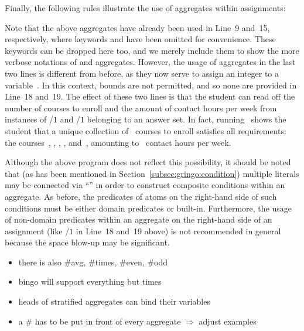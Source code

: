 \begin{example}
Finally, the following rules illustrate the use of aggregates within assignments:
%

%
Note that the above aggregates have already been used in Line~9 and~15, respectively,
where keywords  and  have been omitted for convenience.
These keywords can be dropped here too, and we merely include them to show the
more verbose notations of  and  aggregates.
However, the usage of aggregates in the last two lines is different from before,
as they now serve to assign an integer to a variable~.
In this context, bounds are not permitted, and so none are provided in Line~18 and~19.
The effect of these two lines is that the student can read off the number of
courses to enroll and the amount of contact hours per week from instances of
/$1$ and /$1$ belonging to an answer set.%
%
In fact, running \clasp\ shows the student that a unique
collection of~ courses to enroll satisfies all requirements:
the courses~, , , , and~,
amounting to~ contact hours per week.

Although the above program does not reflect this possibility,
it should be noted that (as has been mentioned in Section~\ref{subsec:gringo:condition})
multiple literals may be connected via ``\code{:}'' in order to construct
composite conditions within an aggregate.
As before, the predicates of atoms on the right-hand side of such conditions
must be either domain predicates or built-in.
Furthermore, the usage of non-domain predicates within an aggregate
on the right-hand side of an assignment (like /$1$ in Line~18 and~19 above)
is not recommended in general because the space blow-up may be significant.
\eexample
\end{example}

\begin{newstuff}
	\begin{itemize}
		\item there is also $\#$avg, $\#$times, $\#$even, $\#$odd
		\item bingo will support everything but times
		\item heads of stratified aggregates can bind their variables
		\item a \# has to be put in front of every aggregate $\Rightarrow$ adjust examples
	\end{itemize}
\end{newstuff}
